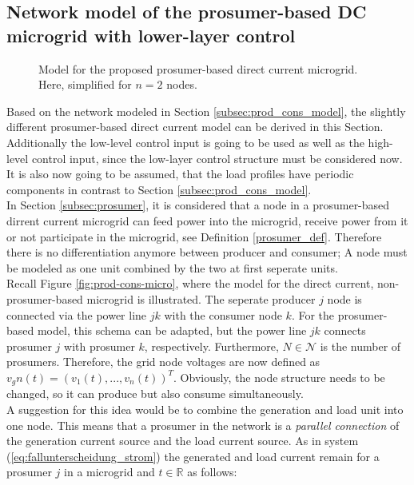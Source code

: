 \subsection{Network model of the prosumer-based DC microgrid with lower-layer control}
\label{subsec:prosumermodel}
\begin{figure}[h]
	\centering
	\caption{Model for the proposed prosumer-based direct current microgrid. Here, simplified for $n = 2$ nodes.}
	\label{fig:pros-micro}
\end{figure}
Based on the network modeled in Section \ref{subsec:prod_cons_model}, the slightly different prosumer-based direct current model can be derived in this Section. Additionally the low-level control input is going to be used as well as the high-level control input, since the low-layer control structure must be considered now. It is also now going to be assumed, that the load profiles have periodic components in contrast to Section \ref{subsec:prod_cons_model}. \\
In Section \ref{subsec:prosumer}, it is considered that a node in a prosumer-based dirrent current microgrid can feed power into the microgrid, receive power from it or not participate in the microgrid, see Definition \ref{prosumer_def}. Therefore there is no differentiation anymore between producer and consumer; A node must be modeled as one unit combined by the two at first seperate units. 
\\Recall Figure \ref{fig:prod-cons-micro}, where the model for the direct current, non-prosumer-based microgrid is illustrated. The seperate producer $j$ node is connected via the power line $jk$ with the consumer node $k$. For the prosumer-based model, this schema can be adapted, but the power line $jk$ connects prosumer $j$ with prosumer $k$, respectively. Furthermore, $N \in \mathcal{N}$ is the number of prosumers. Therefore, the grid node voltages are now defined as \\$v_gn(t) = (v_1(t),...,v_n(t))^T$.
Obviously, the node structure needs to be changed, so it can produce but also consume simultaneously.
\\A suggestion for this idea would be to combine the generation and load unit into one node. This means that a prosumer in the network is a \textit{parallel connection} of the generation current source and the load current source. As in system (\ref{eq:fallunterscheidung_strom}) the generated and load current remain for a prosumer $j$ in a microgrid and $t \in \mathbb{R}$ as follows: 
\setlength{\abovedisplayskip}{5pt}
\setlength{\belowdisplayskip}{5pt}
